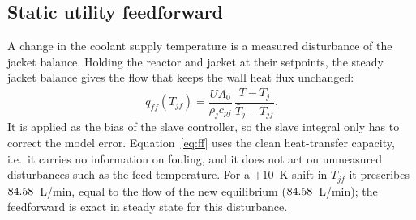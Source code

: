\subsection{Static utility feedforward}
\label{subsec:ff}
A change in the coolant supply temperature is a measured disturbance of the jacket balance. Holding the reactor and jacket at their setpoints, the steady jacket balance gives the flow that keeps the wall heat flux unchanged:
\begin{equation}
q_{ff}(T_{jf}) = \frac{UA_0}{\rho_jc_{pj}}\,\frac{\bar T-\bar T_j}{\bar T_j-T_{jf}}.
\label{eq:ff}
\end{equation}
It is applied as the bias of the slave controller, so the slave integral only has to correct the model error. Equation~\eqref{eq:ff} uses the clean heat-transfer capacity, i.e.\ it carries no information on fouling, and it does not act on unmeasured disturbances such as the feed temperature. For a $+10$~K shift in $T_{jf}$ it prescribes $84.58$~L/min, equal to the flow of the new equilibrium ($84.58$~L/min); the feedforward is exact in steady state for this disturbance.
